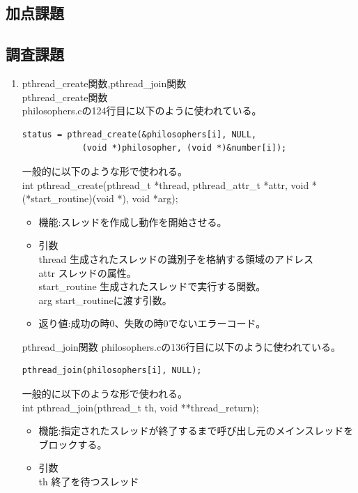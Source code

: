 \documentclass[a4j]{celb-report}
\begin{document}
\subsection{加点課題}
\subsection{調査課題}
\begin{enumerate}
 \renewcommand{\labelenumi}{(\arabic{enumi})}
 \item pthread\_create関数,pthread\_join関数\\
  pthread\_create関数\\
  philosophers.cの124行目に以下のように使われている。
  \begin{lstlisting}[basicstyle=\ttfamily\footnotesize, frame=single]
        status = pthread_create(&philosophers[i], NULL, 
            (void *)philosopher, (void *)&number[i]);
  \end{lstlisting}
  一般的に以下のような形で使われる。\\
  int pthread\_create(pthread\_t *thread, pthread\_attr\_t *attr, void *(*start\_routine)(void *), void *arg);
  \begin{itemize}
   \item 機能:スレッドを作成し動作を開始させる。
   \item 引数\\
   thread 生成されたスレッドの識別子を格納する領域のアドレス\\
   attr	スレッドの属性。\\
   start\_routine 生成されたスレッドで実行する関数。\\
   arg start\_routineに渡す引数。
   \item 返り値:成功の時0、失敗の時0でないエラーコード。
  \end{itemize}
  pthread\_join関数
  philosophers.cの136行目に以下のように使われている。
  \begin{lstlisting}[basicstyle=\ttfamily\footnotesize, frame=single]
        pthread_join(philosophers[i], NULL);
  \end{lstlisting}
  一般的に以下のような形で使われる。\\
  int pthread\_join(pthread\_t th, void **thread\_return);
  \begin{itemize}
   \item 機能:指定されたスレッドが終了するまで呼び出し元のメインスレッドをブロックする。
   \item 引数\\
    th 終了を待つスレッド\\

\end{itemize}
\end{enumerate}
\end{document}
